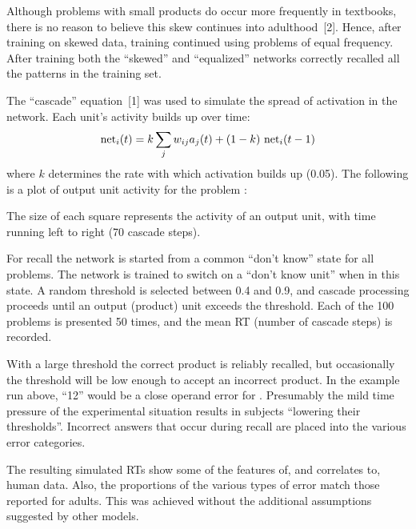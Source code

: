 \begin{multicols}{3}[\showtitle]
Although problems with small products do occur more frequently in
textbooks, there is no reason to believe this skew continues into
adulthood~[2]. Hence, after training on skewed data,
training continued using  problems of
equal frequency.  After training both the ``skewed'' and
``equalized'' networks correctly recalled all the patterns in the
training set.

\vspace*{1mm}



The ``cascade''
equation~[1] was used to simulate the
spread of activation in the network.  Each unit's activity builds
up over time:
\[ \mbox{net}_i(t) = k \sum\limits_j w_{ij} a_j(t) + (1-k)\ \mbox{net}_i(t-1)\]
\noindent where $k$ determines the rate with
which activation builds up (0.05).  The following is a plot of
output unit activity
for the problem :

\vspace*{1mm}


The size of each square represents the activity of an output unit, with
time running left to right (70 cascade steps).


For recall the network is started from a common ``don't know'' state for
all problems.  The network is trained to switch on a ``don't know unit''
when in this state. A random threshold is selected between 0.4 and 0.9, and
cascade processing proceeds until an output (product) unit exceeds the
threshold. Each of the 100 problems is presented 50 times, and the mean RT
(number of cascade steps) is recorded.

With a large threshold the correct product is reliably recalled, but
occasionally the threshold will be low enough to accept an incorrect
product. In the example run above, ``12'' would be a close operand error
for .  Presumably the mild time pressure of the experimental situation
results in subjects ``lowering their thresholds''.  Incorrect answers
that occur during recall are placed into the various error categories.


The resulting simulated RTs show some of the features of, and correlates
to, human data.  Also, the proportions of the various types of error match
those reported for adults.  This was achieved without the additional
assumptions suggested by other models.



\end{multicols}
